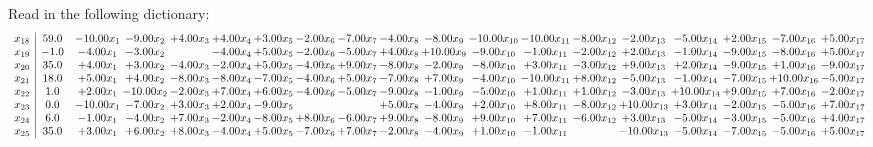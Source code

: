 \documentclass[9pt]{article}
\begin{document}
Read in the following dictionary:
\[\begin{array}{c| c c@{\hskip 2pt} c@{\hskip 2pt} c@{\hskip 2pt} c@{\hskip 2pt} c@{\hskip 2pt} c@{\hskip 2pt} c@{\hskip 2pt} c@{\hskip 2pt} c@{\hskip 2pt} c@{\hskip 2pt} c@{\hskip 2pt} c@{\hskip 2pt} c@{\hskip 2pt} c@{\hskip 2pt} c@{\hskip 2pt} c@{\hskip 2pt} c@{\hskip 2pt} }
 x_{18}   &  59.0 & -10.00 x_{1} & -9.00 x_{2} & +  4.00 x_{3} & +  4.00 x_{4} & +  3.00 x_{5} & -2.00 x_{6} & -7.00 x_{7} & -4.00 x_{8} & -8.00 x_{9} & -10.00 x_{10} & -10.00 x_{11} & -8.00 x_{12} & -2.00 x_{13} & -5.00 x_{14} & +  2.00 x_{15} & -7.00 x_{16} & +  5.00 x_{17}\\
 x_{19}   &  -1.0 & -4.00 x_{1} & -3.00 x_{2} &   & -4.00 x_{4} & +  5.00 x_{5} & -2.00 x_{6} & -5.00 x_{7} & +  4.00 x_{8} & + 10.00 x_{9} & -9.00 x_{10} & -1.00 x_{11} & -2.00 x_{12} & +  2.00 x_{13} & -1.00 x_{14} & -9.00 x_{15} & -8.00 x_{16} & +  5.00 x_{17}\\
 x_{20}   &  35.0 & +  4.00 x_{1} & +  3.00 x_{2} & -4.00 x_{3} & -2.00 x_{4} & +  5.00 x_{5} & -4.00 x_{6} & +  9.00 x_{7} & -8.00 x_{8} & -2.00 x_{9} & -8.00 x_{10} & +  3.00 x_{11} & -3.00 x_{12} & +  9.00 x_{13} & +  2.00 x_{14} & -9.00 x_{15} & +  1.00 x_{16} & -9.00 x_{17}\\
 x_{21}   &  18.0 & +  5.00 x_{1} & +  4.00 x_{2} & -8.00 x_{3} & -8.00 x_{4} & -7.00 x_{5} & -4.00 x_{6} & +  5.00 x_{7} & -7.00 x_{8} & +  7.00 x_{9} & -4.00 x_{10} & -10.00 x_{11} & +  8.00 x_{12} & -5.00 x_{13} & -1.00 x_{14} & -7.00 x_{15} & + 10.00 x_{16} & -5.00 x_{17}\\
 x_{22}   &  1.0 & +  2.00 x_{1} & -10.00 x_{2} & -2.00 x_{3} & +  7.00 x_{4} & +  6.00 x_{5} & -4.00 x_{6} & -5.00 x_{7} & -9.00 x_{8} & -1.00 x_{9} & -5.00 x_{10} & +  1.00 x_{11} & +  1.00 x_{12} & -3.00 x_{13} & + 10.00 x_{14} & +  9.00 x_{15} & +  7.00 x_{16} & -2.00 x_{17}\\
 x_{23}   &  0.0 & -10.00 x_{1} & -7.00 x_{2} & +  3.00 x_{3} & +  2.00 x_{4} & -9.00 x_{5} &    &   & +  5.00 x_{8} & -4.00 x_{9} & +  2.00 x_{10} & +  8.00 x_{11} & -8.00 x_{12} & + 10.00 x_{13} & +  3.00 x_{14} & -2.00 x_{15} & -5.00 x_{16} & +  7.00 x_{17}\\
 x_{24}   &  6.0 & -1.00 x_{1} & -4.00 x_{2} & +  7.00 x_{3} & -2.00 x_{4} & -8.00 x_{5} & +  8.00 x_{6} & -6.00 x_{7} & +  9.00 x_{8} & -8.00 x_{9} & +  9.00 x_{10} & +  7.00 x_{11} & -6.00 x_{12} & +  3.00 x_{13} & -5.00 x_{14} & -3.00 x_{15} & -5.00 x_{16} & +  4.00 x_{17}\\
 x_{25}   &  35.0 & +  3.00 x_{1} & +  6.00 x_{2} & +  8.00 x_{3} & -4.00 x_{4} & +  5.00 x_{5} & -7.00 x_{6} & +  7.00 x_{7} & -2.00 x_{8} & -4.00 x_{9} & +  1.00 x_{10} & -1.00 x_{11} &   & -10.00 x_{13} & -5.00 x_{14} & -7.00 x_{15} & -5.00 x_{16} & +  5.00 x_{17}\\

\end{array}\]
\end{document}
